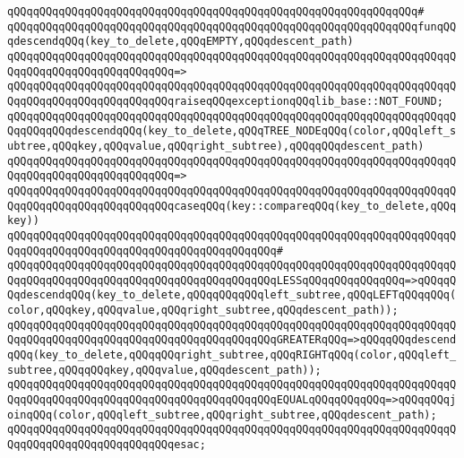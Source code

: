 \verb|qQQqqQQqqQQqqQQqqQQqqQQqqQQqqQQqqQQqqQQqqQQqqQQqqQQqqQQqqQQqqQQq#|\newline
\verb|qQQqqQQqqQQqqQQqqQQqqQQqqQQqqQQqqQQqqQQqqQQqqQQqqQQqqQQqqQQqqQQqfunqQQqdescendqQQq(key_to_delete,qQQqEMPTY,qQQqdescent_path)|\newline
\verb|qQQqqQQqqQQqqQQqqQQqqQQqqQQqqQQqqQQqqQQqqQQqqQQqqQQqqQQqqQQqqQQqqQQqqQQqqQQqqQQqqQQqqQQqqQQqqQQq=>|\newline
\verb|qQQqqQQqqQQqqQQqqQQqqQQqqQQqqQQqqQQqqQQqqQQqqQQqqQQqqQQqqQQqqQQqqQQqqQQqqQQqqQQqqQQqqQQqqQQqqQQqraiseqQQqexceptionqQQqlib_base::NOT_FOUND;|\newline
\newline
\verb|qQQqqQQqqQQqqQQqqQQqqQQqqQQqqQQqqQQqqQQqqQQqqQQqqQQqqQQqqQQqqQQqqQQqqQQqqQQqqQQqdescendqQQq(key_to_delete,qQQqTREE_NODEqQQq(color,qQQqleft_subtree,qQQqkey,qQQqvalue,qQQqright_subtree),qQQqqQQqdescent_path)|\newline
\verb|qQQqqQQqqQQqqQQqqQQqqQQqqQQqqQQqqQQqqQQqqQQqqQQqqQQqqQQqqQQqqQQqqQQqqQQqqQQqqQQqqQQqqQQqqQQqqQQq=>|\newline
\verb|qQQqqQQqqQQqqQQqqQQqqQQqqQQqqQQqqQQqqQQqqQQqqQQqqQQqqQQqqQQqqQQqqQQqqQQqqQQqqQQqqQQqqQQqqQQqqQQqcaseqQQq(key::compareqQQq(key_to_delete,qQQqkey))|\newline
\verb|qQQqqQQqqQQqqQQqqQQqqQQqqQQqqQQqqQQqqQQqqQQqqQQqqQQqqQQqqQQqqQQqqQQqqQQqqQQqqQQqqQQqqQQqqQQqqQQqqQQqqQQqqQQqqQQq#|\newline
\verb|qQQqqQQqqQQqqQQqqQQqqQQqqQQqqQQqqQQqqQQqqQQqqQQqqQQqqQQqqQQqqQQqqQQqqQQqqQQqqQQqqQQqqQQqqQQqqQQqqQQqqQQqqQQqqQQqLESSqQQqqQQqqQQqqQQq=>qQQqqQQqdescendqQQq(key_to_delete,qQQqqQQqqQQqleft_subtree,qQQqLEFTqQQqqQQq(color,qQQqkey,qQQqvalue,qQQqright_subtree,qQQqdescent_path));|\newline
\verb|qQQqqQQqqQQqqQQqqQQqqQQqqQQqqQQqqQQqqQQqqQQqqQQqqQQqqQQqqQQqqQQqqQQqqQQqqQQqqQQqqQQqqQQqqQQqqQQqqQQqqQQqqQQqqQQqGREATERqQQq=>qQQqqQQqdescendqQQq(key_to_delete,qQQqqQQqright_subtree,qQQqRIGHTqQQq(color,qQQqleft_subtree,qQQqqQQqkey,qQQqvalue,qQQqdescent_path));|\newline
\newline
\verb|qQQqqQQqqQQqqQQqqQQqqQQqqQQqqQQqqQQqqQQqqQQqqQQqqQQqqQQqqQQqqQQqqQQqqQQqqQQqqQQqqQQqqQQqqQQqqQQqqQQqqQQqqQQqqQQqEQUALqQQqqQQqqQQq=>qQQqqQQqjoinqQQq(color,qQQqleft_subtree,qQQqright_subtree,qQQqdescent_path);|\newline
\verb|qQQqqQQqqQQqqQQqqQQqqQQqqQQqqQQqqQQqqQQqqQQqqQQqqQQqqQQqqQQqqQQqqQQqqQQqqQQqqQQqqQQqqQQqqQQqqQQqesac;|\newline
\newline
